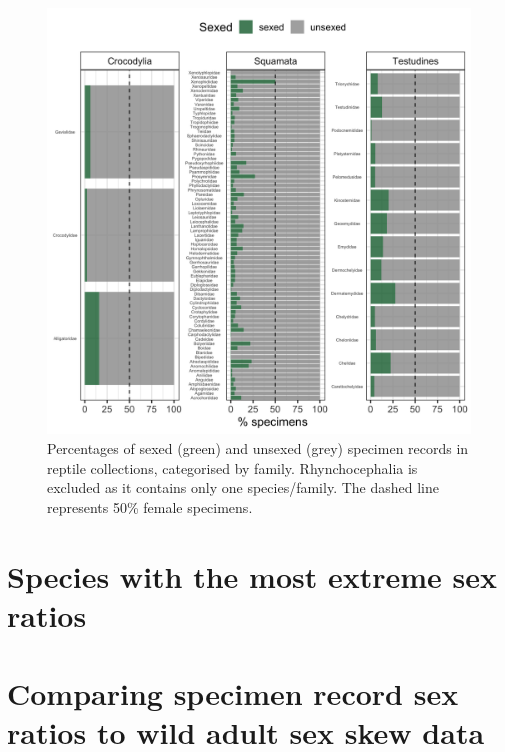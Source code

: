 \documentclass[a4paper, 12pt]{article}
\begin{document}
\begin{figure}[H]
 \centering
  \includegraphics[width = \linewidth]{figures/all-unsexed-family-reptiles.png}
  \caption{Percentages of sexed (green) and unsexed (grey) specimen records in reptile collections, categorised by family. Rhynchocephalia is excluded as it contains only one species/family. 
  The dashed line represents 50\% female specimens.}
  \label{fig-reptile-family-unsexed}
\end{figure}



\newpage
\section{Species with the most extreme sex ratios}





\newpage
\section{Comparing specimen record sex ratios to wild adult sex skew data}
\end{document}
